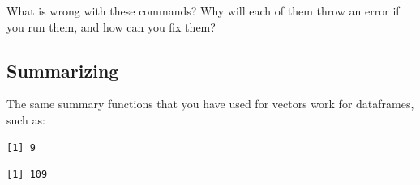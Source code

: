 \documentclass[
]{book}
\newenvironment{Shaded}{\begin{snugshade}}{\end{snugshade}}
\newcommand{\CommentTok}[1]{\textcolor[rgb]{0.56,0.35,0.01}{\textit{#1}}}
\newcommand{\DecValTok}[1]{\textcolor[rgb]{0.00,0.00,0.81}{#1}}
\newcommand{\KeywordTok}[1]{\textcolor[rgb]{0.13,0.29,0.53}{\textbf{#1}}}
\newcommand{\NormalTok}[1]{#1}
\newcommand{\OperatorTok}[1]{\textcolor[rgb]{0.81,0.36,0.00}{\textbf{#1}}}
\begin{document}
What is wrong with these commands? Why will each of them throw an error if you run them, and how can you fix them?

\begin{Shaded}
\end{Shaded}

\hypertarget{summarizing}{%
\subsection*{Summarizing}\label{summarizing}}

The same summary functions that you have used for vectors work for dataframes, such as:

\begin{Shaded}
\end{Shaded}

\begin{verbatim}
[1] 9
\end{verbatim}

\begin{Shaded}
\end{Shaded}

\begin{verbatim}
[1] 109
\end{verbatim}

\begin{Shaded}
\end{Shaded}
\end{document}
